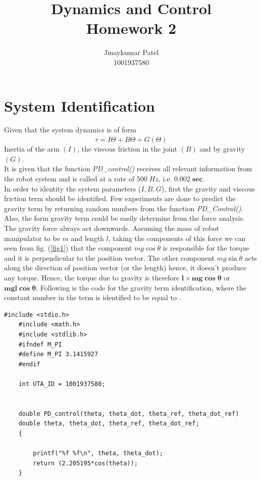 \documentclass[12pt]{article}
\title{%
	Dynamics and Control \\
	\large Homework 2 }
\author{Jinaykumar Patel \\ 1001937580}
\date{}
\begin{document}
	\maketitle
	
\section{System Identification}
Given that the system dynamics is of form 
\begin{equation}
	\tau=I \ddot{\Theta}+B \dot{\Theta}+G(\Theta)
\end{equation}
Inertia of the arm $(I)$, the viscous friction in the joint $(B)$ and by gravity $(G)$.\\
It is given that the function \textit{PD\_control()} receives all relevant information from the robot system and is called at a rate of $500 \; Hz$, i.e. $\mathbf{0.002 \; sec}$.\\

In order to identity the system parameters ($I, B, G$), first the gravity and viscous friction term should be identified. Few experiments are done to predict the gravity term by returning random numbers from the function \textit{PD\_Control()}. 
Also, the form gravity term could be easily determine from the force analysis. The gravity force always act downwards. Assuming the mass of robot manipulator to be $m$ and length $l$, taking the components of this force we can seen from fig. (\ref{fig1}) that the component $mg \cos{\theta}$ is responsible for the torque and it is perpendicular to the position vector. The other component  $mg \sin{\theta}$ acts along the direction of position vector (or the length) hence, it doesn't produce any torque. Hence, the torque due to gravity is therefore $\mathbf{l \times mg \cos{\theta}}$ or $\mathbf{mgl\cos{\theta}}$. Following is the code for the gravity term identification, where the constant number in the term is identified to be equal to .

\begin{lstlisting}[style=CStyle]
	#include <stdio.h>
	#include <math.h>
	#include <stdlib.h>
	#ifndef M_PI
	#define M_PI 3.1415927
	#endif
	
	int UTA_ID = 1001937580;
	
	
	double PD_control(theta, theta_dot, theta_ref, theta_dot_ref)
	double theta, theta_dot, theta_ref, theta_dot_ref;
	{
		
		printf("%f %f\n", theta, theta_dot);
		return (2.205195*cos(theta));
	}
\end{lstlisting}
\end{document}
